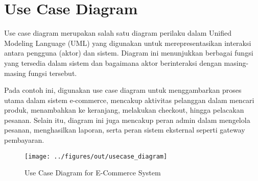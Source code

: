 \section{Use Case Diagram}

Use case diagram merupakan salah satu diagram perilaku dalam Unified Modeling Language (UML) yang digunakan untuk merepresentasikan interaksi antara pengguna (aktor) dan sistem. Diagram ini menunjukkan berbagai fungsi yang tersedia dalam sistem dan bagaimana aktor berinteraksi dengan masing-masing fungsi tersebut. 

Pada contoh ini, digunakan use case diagram untuk menggambarkan proses utama dalam sistem e-commerce, mencakup aktivitas pelanggan dalam mencari produk, menambahkan ke keranjang, melakukan checkout, hingga pelacakan pesanan. Selain itu, diagram ini juga mencakup peran admin dalam mengelola pesanan, menghasilkan laporan, serta peran sistem eksternal seperti gateway pembayaran.

\begin{figure}
	\centering
	\texttt{[image: ../figures/out/usecase\_diagram]}
	\caption{Use Case Diagram for E-Commerce System}
	\label{fig:usecase_diagram}
\end{figure}

